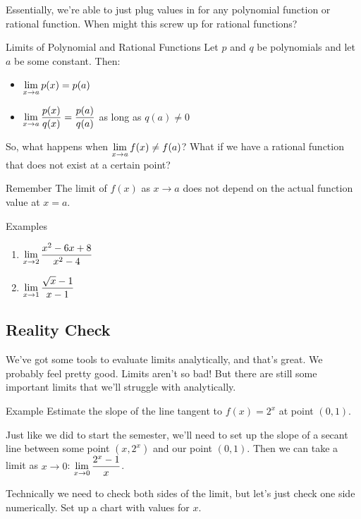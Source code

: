 Essentially, we're able to just plug values in for any polynomial function or rational function.
When might this screw up for rational functions?

\begin{thm}{Limits of Polynomial and Rational Functions}
  Let $p$ and $q$ be polynomials and let $a$ be some constant.
  Then:
  \begin{itemize}
    \item $\displaystyle \lim_{x\to a} p(x) = p(a)$
    \item $\displaystyle \lim_{x\to a} \dfrac{p(x)}{q(x)} = \dfrac{p(a)}{q(a)}$ as long as $q(a)\neq 0$
  \end{itemize}
\end{thm}

So, what happens when $\displaystyle \lim_{x\to a} f(x) \neq f(a)$?
What if we have a rational function that does not exist at a certain point?

\begin{note}{Remember}
  The limit of $f(x)$ as $x\to a$ does not depend on the actual function value at $x=a$.
\end{note}

\begin{note}{Examples}
  \begin{multicols}{2}
    \begin{enumerate}
      \item $\displaystyle \lim_{x\to2} \dfrac{x^2-6x+8}{x^2-4}$
      \item $\displaystyle \lim_{x\to1} \dfrac{\sqrt{x}-1}{x-1}$
    \end{enumerate}
  \end{multicols}
\end{note}

\subsection*{Reality Check}

We've got some tools to evaluate limits analytically, and that's great.
We probably feel pretty good.
Limits aren't so bad!
But there are still some important limits that we'll struggle with analytically.

\begin{note}{Example}
  Estimate the slope of the line tangent to $f(x) = 2^x$ at point $(0,1)$.

  Just like we did to start the semester, we'll need to set up the slope of a secant line between some point $(x, 2^x)$ and our point $(0,1)$.
  Then we can take a limit as $x\to0$: $\displaystyle \lim_{x\to0} \dfrac{2^x-1}{x}$.

  Technically we need to check both sides of the limit, but let's just check one side numerically.
   Set up a chart with values for $x$.
\end{note}

